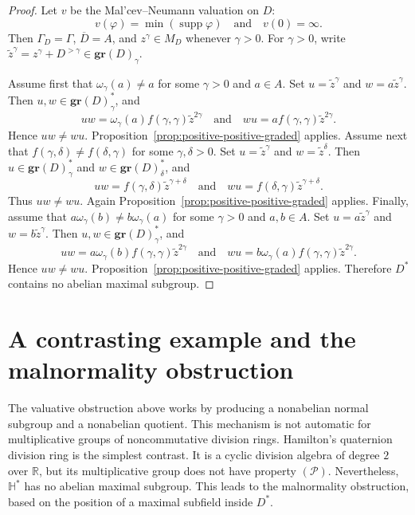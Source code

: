 \documentclass[11pt]{amsart}
\theoremstyle{definition}
\begin{document}
\begin{proof}
Let $v$ be the Mal'cev--Neumann valuation on $D$:
\[
        v(\varphi)=\min(\operatorname{supp}\varphi)\quad\text{and}\quad v(0)=\infty.
\]
Then $\Gamma_D=\Gamma$, $\overline D=A$, and $z^\gamma\in M_D$ whenever
$\gamma>0$. For $\gamma>0$, write
$\widetilde z^\gamma=z^\gamma+D^{>\gamma}\in \mathbf{gr}(D)_\gamma$.

Assume first that $\omega_\gamma(a)\ne a$ for some $\gamma>0$ and $a\in A$.
Set $u=\widetilde z^\gamma$ and $w=a\widetilde z^\gamma$. Then
$u,w\in \mathbf{gr}(D)_\gamma^*$, and
\[
        uw=\omega_\gamma(a)f(\gamma,\gamma)\widetilde z^{2\gamma}
        \quad\text{and}\quad
        wu=af(\gamma,\gamma)\widetilde z^{2\gamma}.
\]
Hence $uw\ne wu$. Proposition~\ref{prop:positive-positive-graded} applies.
Assume next that $f(\gamma,\delta)\ne f(\delta,\gamma)$ for some
$\gamma,\delta>0$. Set $u=\widetilde z^\gamma$ and
$w=\widetilde z^\delta$. Then $u\in \mathbf{gr}(D)_\gamma^*$ and
$w\in \mathbf{gr}(D)_\delta^*$, and
\[
        uw=f(\gamma,\delta)\widetilde z^{\gamma+\delta}
        \quad\text{and}\quad
        wu=f(\delta,\gamma)\widetilde z^{\gamma+\delta}.
\]
Thus $uw\ne wu$. Again Proposition~\ref{prop:positive-positive-graded}
applies.
Finally, assume that $a\omega_\gamma(b)\ne b\omega_\gamma(a)$ for some
$\gamma>0$ and $a,b\in A$. Set $u=a\widetilde z^\gamma$ and
$w=b\widetilde z^\gamma$. Then $u,w\in \mathbf{gr}(D)_\gamma^*$, and
\[
        uw=a\omega_\gamma(b)f(\gamma,\gamma)\widetilde z^{2\gamma}
        \quad\text{and}\quad
        wu=b\omega_\gamma(a)f(\gamma,\gamma)\widetilde z^{2\gamma}.
\]
Hence $uw\ne wu$. Proposition~\ref{prop:positive-positive-graded} applies.
Therefore $D^*$ contains no abelian maximal subgroup.
\end{proof}

\section{A contrasting example and the malnormality obstruction}
\label{sec:hamilton}
\label{sec:malnormal}

The valuative obstruction above works by producing a nonabelian normal
subgroup and a nonabelian quotient.  This mechanism is not automatic for
multiplicative groups of noncommutative division rings.  Hamilton's quaternion
division ring is the simplest contrast.  It is a cyclic division algebra of
degree $2$ over $\mathbb R$, but its multiplicative group does not have
property $(\mathcal P)$.  Nevertheless, $\mathbb H^*$ has no abelian maximal
subgroup.  This leads to the malnormality obstruction, based on the position of a
maximal subfield inside $D^*$.
\end{document}
